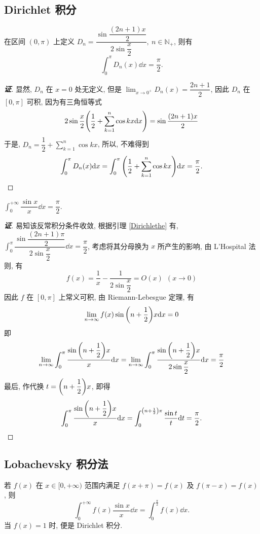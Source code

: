 \subsection{Dirichlet 积分}

\begin{lemma}[Dirichlet 核]
    \label{Dirichlethe}
    在区间 $(0,\pi)$ 上定义 $D_n=\dfrac{\sin\dfrac{(2n+1)x}{2}}{2\sin\dfrac{x}{2}},~n\in\mathbb{N}_+$, 则有 $$\int_{0}^{\pi}D_n(x)\dd x=\dfrac{\pi}{2}.$$
\end{lemma}
\begin{proof}[{\songti \textbf{证}}]
    显然, $D_n$ 在 $x=0$ 处无定义, 但是 $\displaystyle\lim_{x\to0^+}D_n(x)=\dfrac{2n+1}{2}$, 因此 $D_n$ 在 $[0,\pi]$ 可积, 因为有三角恒等式
    $$2\sin\dfrac{x}{2}\qty(\dfrac{1}{2}+\sum_{k=1}^{n}\cos kx\dd x)=\sin\dfrac{(2n+1)x}{2}$$
    于是, $\displaystyle D_n=\dfrac{1}{2}+\sum_{k=1}^{n}\cos kx$, 所以, 不难得到
    $$\int_{0}^{\pi}D_n(x)\dd x=\int_{0}^{\pi}\qty(\dfrac{1}{2}+\sum_{k=1}^{n}\cos kx)\dd x=\dfrac{\pi}{2}.$$
\end{proof}

\begin{theorem}
    $\displaystyle\int_{0}^{+\infty}\dfrac{\sin x}{x}\dd x=\dfrac{\pi}{2}.$
\end{theorem}
\begin{proof}[{\songti \textbf{证}}]
    易知该反常积分条件收敛, 根据引理 \ref{Dirichlethe} 有, $\displaystyle\int_{0}^{\pi}\dfrac{\sin\dfrac{(2n+1)\pi}{2}}{2\sin\dfrac{x}{2}}\dd x=\dfrac{\pi}{2}$, 考虑将其分母换为 $x$ 所产生的影响, 
    由 L'Hospital 法则, 有 $$f(x)=\dfrac{1}{x}-\dfrac{1}{2\sin\dfrac{x}{2}}=O(x)~~ (x\to0)$$
    因此 $f$ 在 $[0,\pi]$ 上常义可积, 由 Riemann-Lebesgue 定理, 有
    $$\lim_{n\to\infty}f(x)\sin\qty(n+\dfrac{1}{2})x\dd x=0$$
    即 $$\lim_{n\to\infty}\int_{0}^{\pi}\dfrac{\sin\qty(n+\dfrac{1}{2})x}{x}\dd x=\lim_{n\to\infty}\int_{0}^{\pi}\dfrac{\sin\qty(n+\dfrac{1}{2})x}{2\sin\dfrac{x}{2}}\dd x=\dfrac{\pi}{2}$$
    最后, 作代换 $t=\qty(n+\dfrac{1}{2})x$, 即得 $$\int_{0}^{\pi}\dfrac{\sin\qty(n+\dfrac{1}{2})x}{x}\dd x=\int_{0}^{\qty(n+\frac{1}{2})\pi}\dfrac{\sin t}{t}\dd t=\dfrac{\pi}{2}.$$
\end{proof}

\subsection{Lobachevsky 积分法}

\begin{theorem}
    若 $f(x)$ 在 $x\in[0,+\infty)$ 范围内满足 $f(x+\pi)=f(x)$ 及 $f(\pi-x)=f(x)$, 则
    $$\int_{0}^{+\infty}f(x)\dfrac{\sin x}{x}\dd x=\int_{0}^{\frac{\pi}{2}}f(x)\dd x.$$
    当 $f(x)=1$ 时, 便是 Dirichlet 积分.
\end{theorem}

